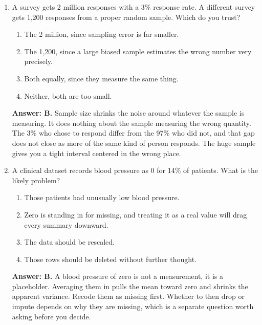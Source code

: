 \documentclass[11pt]{article}
\begin{document}
\begin{enumerate}[itemsep=14pt]
\item A survey gets 2 million responses with a 3\% response rate. A different survey gets 1{,}200 responses from a proper random sample. Which do you trust?

\begin{enumerate}[label=\Alph*., itemsep=1pt, topsep=3pt]
  \item The 2 million, since sampling error is far smaller.
  \item The 1{,}200, since a large biased sample estimates the wrong number very precisely.
  \item Both equally, since they measure the same thing.
  \item Neither, both are too small.
\end{enumerate}

\vspace{2pt}
\textbf{Answer: B.} Sample size shrinks the noise around whatever the sample is measuring. It does nothing about the sample measuring the wrong quantity. The 3\% who chose to respond differ from the 97\% who did not, and that gap does not close as more of the same kind of person responds. The huge sample gives you a tight interval centered in the wrong place.
\vspace{4pt}

\item A clinical dataset records blood pressure as 0 for 14\% of patients. What is the likely problem?

\begin{enumerate}[label=\Alph*., itemsep=1pt, topsep=3pt]
  \item Those patients had unusually low blood pressure.
  \item Zero is standing in for missing, and treating it as a real value will drag every summary downward.
  \item The data should be rescaled.
  \item Those rows should be deleted without further thought.
\end{enumerate}

\vspace{2pt}
\textbf{Answer: B.} A blood pressure of zero is not a measurement, it is a placeholder. Averaging them in pulls the mean toward zero and shrinks the apparent variance. Recode them as missing first. Whether to then drop or impute depends on why they are missing, which is a separate question worth asking before you decide.
\vspace{4pt}


\end{enumerate}
\end{document}
